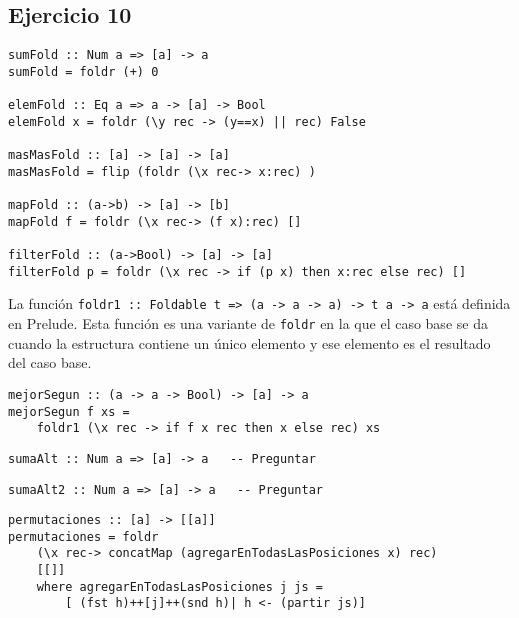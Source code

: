 \subsection{Ejercicio 10}
\begin{centrado}
	\begin{verbatim}
sumFold :: Num a => [a] -> a
sumFold = foldr (+) 0

elemFold :: Eq a => a -> [a] -> Bool
elemFold x = foldr (\y rec -> (y==x) || rec) False

masMasFold :: [a] -> [a] -> [a]
masMasFold = flip (foldr (\x rec-> x:rec) )

mapFold :: (a->b) -> [a] -> [b]
mapFold f = foldr (\x rec-> (f x):rec) []

filterFold :: (a->Bool) -> [a] -> [a]
filterFold p = foldr (\x rec -> if (p x) then x:rec else rec) []
	\end{verbatim}
\end{centrado}

La función \texttt{foldr1 :: Foldable t => (a -> a -> a) -> t a -> a} está definida en Prelude. Esta función es una variante de \texttt{foldr} en la que el caso base se da cuando la estructura contiene un único elemento y ese elemento es el resultado del caso base.

\begin{centrado}
	\begin{verbatim}
mejorSegun :: (a -> a -> Bool) -> [a] -> a
mejorSegun f xs = 
	foldr1 (\x rec -> if f x rec then x else rec) xs
	\end{verbatim}
\end{centrado}

\begin{centrado}
	\begin{verbatim}
sumaAlt :: Num a => [a] -> a   -- Preguntar
	\end{verbatim}
\end{centrado}

\begin{centrado}
	\begin{verbatim}
sumaAlt2 :: Num a => [a] -> a   -- Preguntar
	\end{verbatim}
\end{centrado}

\begin{centrado}
	\begin{verbatim}
permutaciones :: [a] -> [[a]]
permutaciones = foldr 
	(\x rec-> concatMap (agregarEnTodasLasPosiciones x) rec) 
	[[]] 
	where agregarEnTodasLasPosiciones j js = 
		[ (fst h)++[j]++(snd h)| h <- (partir js)]
	\end{verbatim}
\end{centrado}

